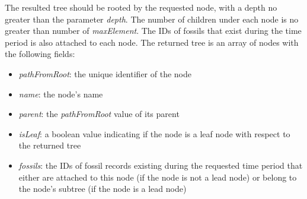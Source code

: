 \documentclass[11pt, a4paper,oneside,chapterprefix=false]{scrbook}
\begin{document}
The resulted tree should be rooted by the requested node, with a depth no greater than the parameter \emph{depth}. The number of children under each node is no greater than number of \emph{maxElement}. The IDs of fossils that exist during the time period is also attached to each node. The returned tree is an array of nodes with the following fields:  

\begin{itemize}
	\item \textit{pathFromRoot}: the unique identifier of the node
	\item \textit{name}: the node's name
	\item \textit{parent}: the \textit{pathFromRoot} value of its parent
	\item \textit{isLeaf}: a boolean value indicating if the node is a leaf node with respect to the returned tree
	\item \textit{fossils}: the IDs of fossil records existing during the requested time period that either are attached to this node (if the node is not a lead node) or belong to the node's subtree (if the node is a lead node)
\end{itemize}
\end{document}
